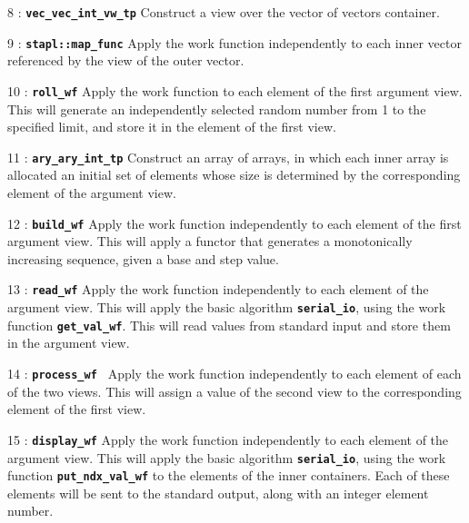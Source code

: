 \documentclass{report}
\begin{document}
\begin{hashitemize}
\item 8 : \texttt{{\bf vec\_vec\_int\_vw\_tp}}
\newline
Construct a view over the vector of vectors container.

\item 9 : \texttt{{\bf stapl::map\_func}}
\newline
Apply the work function independently to each inner vector referenced by
the view of the outer vector.

\item 10 : \texttt{{\bf roll\_wf}}
\newline
Apply the work function to each element of the first argument view.
This will generate an independently selected random number from 1 to
the specified limit, and store it in the element of the first view.

\item 11 : \texttt{{\bf ary\_ary\_int\_tp}}
\newline
Construct an array of arrays, in which each inner array is allocated
an initial set of elements whose size is determined by the corresponding
element of the argument view.

\item 12 : \texttt{{\bf build\_wf}}
\newline
Apply the work function independently to each element of the first argument
view.  This will apply a functor that generates a monotonically increasing
sequence, given a base and step value.

\item 13 : \texttt{{\bf read\_wf}}
\newline
Apply the work function independently to each element of the argument view.
This will apply the basic algorithm
\texttt{{\bf serial\_io}},
using the work function
\texttt{{\bf get\_val\_wf}}.
This will read values from standard input and store them in the argument view.

\item 14 : \texttt{{\bf process\_wf }}
\newline
Apply the work function independently to each element of each of the two
views.  This will assign a value of the second view to the corresponding
element of the first view.

\item 15 : \texttt{{\bf display\_wf}}
\newline
Apply the work function independently to each element of the argument view.
This will apply the basic algorithm
\texttt{{\bf serial\_io}},
using the work function
\texttt{{\bf put\_ndx\_val\_wf}}
to the elements of the inner containers.
Each of these elements will be sent to the standard output, along with
an integer element number.

\end{hashitemize}
\end{document}
